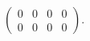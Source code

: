 \begin{Exercise}
\begin{answer}
$
\begin{pmatrix}
0 & 0 & 0 & 0 \\
0 & 0 & 0 & 0
\end{pmatrix}.
$
\end{answer}
\end{Exercise}